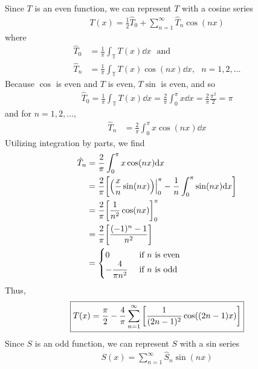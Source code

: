 \documentclass[12pt]{article}
\theoremstyle{plain}
\begin{document}
\begin{enumerate}[\bf (a)]
        Since $T$ is an even function, we can represent $T$ with a cosine series
        \begin{align*}
            T(x) = \frac{1}{2}\hat{T}_0 + \sum_{n=1}^\infty \hat{T}_n\cos(n x)
        \end{align*}
        where
        \begin{align*}
            \hat{T}_0 &= \frac{1}{\pi}\int_\mathbb{T} T(x) \dd x\ \ \ \text{and}\\
            \hat{T}_n &= \frac{1}{\pi}\int_\mathbb{T} T(x) \cos (nx) \dd x,\ \ \ n = 1, 2, \dots
        \end{align*}
        Because $\cos$ is even and $T$ is even, $T \sin$ is even, and so
        \begin{align*}
            \hat{T}_0 = \frac{1}{\pi}\int_\mathbb{T} T(x) \dd x = \frac{2}{\pi}\int_0^\pi x \dd x = \frac{2}{\pi}\frac{\pi^2}{2} = \pi
        \end{align*}
        and for $n = 1, 2, \dots$,
        \begin{align*}
            \hat{T}_n &= \frac{2}{\pi}\int_0^\pi x\cos(nx) \dd x
        \end{align*}
        Utilizing integration by parts, we find
        \begin{align*}
            \hat{T}_n &= \frac{2}{\pi}\int_0^\pi x \cos (nx) \dd x \\
            &= \frac{2}{\pi}\qty[\qty(\frac{x}{n}\sin (nx))\Big|_0^\pi -\frac{1}{n}\int_0^\pi \sin(nx)\dd x] \\
            &= \frac{2}{\pi}\qty[\frac{1}{n^2}\cos (nx)]_0^\pi \\
            &= \frac{2}{\pi}\qty[\frac{(-1)^n - 1}{n^2}] \\
            &= \begin{cases}
                0 & \text{ if $n$ is even} \\
                -\dfrac{4}{\pi n^2} & \text{ if $n$ is odd}
            \end{cases}
        \end{align*}
        Thus,
        \begin{align*}
            \boxed{T(x) = \frac{\pi}{2} - \frac{4}{\pi}\sum_{n=1}^\infty \qty[\frac{1}{(2n-1)^2}\cos((2n-1)x)]}
        \end{align*}
        Since $S$ is an odd function, we can represent $S$ with a sin series
        \begin{align*}
            S(x) = \sum_{n=1}^\infty \hat{S}_n \sin(nx)
        \end{align*}

\end{enumerate}
\end{document}
